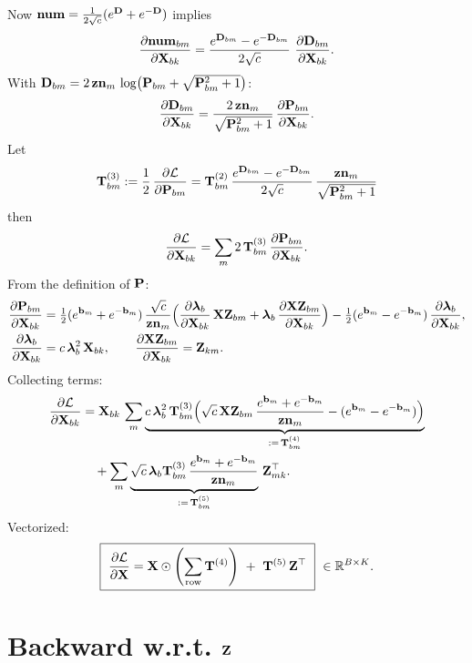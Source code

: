 \documentclass{article}
\begin{document}
Now $\v{num}=\tfrac{1}{2\sqrt{c}}(\ev{D}+\ev{-D})$ implies
\begin{align}
\ddfrac{\v{num}{bm}}{\v{X}{bk}}
= \frac{\ev{D}{bm}-\ev{-D}{bm}}{2\sqrt{c}}\ \ddfrac{\v{D}{bm}}{\v{X}{bk}}.
\end{align}
With $\v{D}{bm}=2\,\v{zn}{m}\,\log\!\big(\v{P}{bm}+\sqrt{\v{P}{bm}^2+1}\big)$:
\begin{align}
\ddfrac{\v{D}{bm}}{\v{X}{bk}}
= \frac{2\,\v{zn}{m}}{\sqrt{\v{P}{bm}^2+1}}\,\ddfrac{\v{P}{bm}}{\v{X}{bk}}.
\end{align}
Let
\[
\T{3}{bm}:= \frac{1}{2}\,\ddfrac{\mathcal{L}}{\v{P}{bm}} = \T{2}{bm}\,\frac{\ev{D}{bm}-\ev{-D}{bm}}{2\sqrt{c}}\,\frac{\v{zn}{m}}{\sqrt{\v{P}{bm}^2+1}}
\]
then
\begin{align}
\ddfrac{\mathcal{L}}{\v{X}{bk}}
= \sum_m 2\,\T{3}{bm}\,\ddfrac{\v{P}{bm}}{\v{X}{bk}}.
\end{align}
From the definition of $\v{P}$:
\begin{align}
\ddfrac{\v{P}{bm}}{\v{X}{bk}}
&= \tfrac12(\ev{b}{m}+\ev{-b}{m})\,\frac{\sqrt{c}}{\v{zn}{m}}
\Big(\ddfrac{\lam_b}{\v{X}{bk}}\,\v{XZ}{bm} + \lam_b\,\ddfrac{\v{XZ}{bm}}{\v{X}{bk}}\Big)
- \tfrac12(\ev{b}{m}-\ev{-b}{m})\,\ddfrac{\lam_b}{\v{X}{bk}},
\\
\ddfrac{\lam_b}{\v{X}{bk}} &= c\,\lam_b^2\,\v{X}{bk},\qquad
\ddfrac{\v{XZ}{bm}}{\v{X}{bk}} = \v{Z}{km}.
\end{align}
Collecting terms:
\begin{align}
\ddfrac{\mathcal{L}}{\v{X}{bk}}
&= \v{X}{bk}\,\sum_m \underbrace{c\,\lam_b^2\,\T{3}{bm}\Big(\sqrt{c}\,\v{XZ}{bm}\,\frac{\ev{b}{m}+\ev{-b}{m}}{\v{zn}{m}} - (\ev{b}{m}-\ev{-b}{m})\Big)}_{:=\,\T{4}{bm}} \\
&\quad + \sum_m \underbrace{\sqrt{c}\,\lam_b \T{3}{bm}\,\frac{\ev{b}{m}+\ev{-b}{m}}{\v{zn}{m}}}_{:=\,\T{5}{bm}}\,\v{Z}{mk}^{\top}.
\end{align}
Vectorized:
\[
\boxed{\ \ddfrac{\mathcal{L}}{\v{X}} = \v{X} \odot \rownorm{\T{4}}\ +\ \T{5}\,\v{Z}^{\top}\ }\ \in\mathbb{R}^{B\times K}.
\]

\section{Backward w.r.t. $\v{Z}$}
\end{document}
